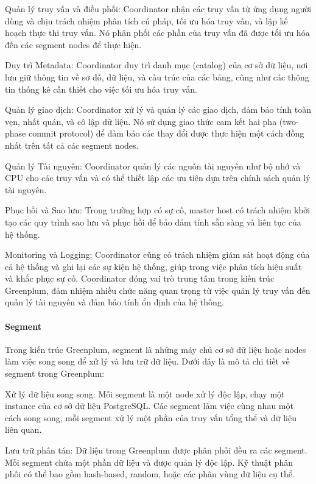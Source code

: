 \documentclass[14pt]{article}
\begin{document}
Quản lý truy vấn và điều phối: Coordinator nhận các truy vấn từ ứng dụng người dùng và chịu trách nhiệm phân tích cú pháp, tối ưu hóa truy vấn, và lập kế hoạch thực thi truy vấn. Nó phân phối các phần của truy vấn đã được tối ưu hóa đến các segment nodes để thực hiện.


Duy trì Metadata: Coordinator duy trì danh mục (catalog) của cơ sở dữ liệu, nơi lưu giữ thông tin về sơ đồ, dữ liệu, và cấu trúc của các bảng, cũng như các thông tin thống kê cần thiết cho việc tối ưu hóa truy vấn.

Quản lý giao dịch: Coordinator xử lý và quản lý các giao dịch, đảm bảo tính toàn vẹn, nhất quán, và cô lập dữ liệu. Nó sử dụng giao thức cam kết hai pha (two-phase commit protocol) để đảm bảo các thay đổi được thực hiện một cách đồng nhất trên tất cả các segment nodes.


Quản lý Tài nguyên: Coordinator quản lý các nguồn tài nguyên như bộ nhớ và CPU cho các truy vấn và có thể thiết lập các ưu tiên dựa trên chính sách quản lý tài nguyên.

Phục hồi và Sao lưu: Trong trường hợp có sự cố, master host có trách nhiệm khởi tạo các quy trình sao lưu và phục hồi để bảo đảm tính sẵn sàng và liên tục của hệ thống.

Monitoring và Logging: Coordinator cũng có trách nhiệm giám sát hoạt động của cả hệ thống và ghi lại các sự kiện hệ thống, giúp trong việc phân tích hiệu suất và khắc phục sự cố. Coordinator đóng vai trò trung tâm trong kiến trúc Greenplum, đảm nhiệm nhiều chức năng quan trọng từ việc quản lý truy vấn đến quản lý tài nguyên và đảm bảo tính ổn định của hệ thống.

\paragraph{Segment}

Trong kiến trúc Greenplum, segment là những máy chủ cơ sở dữ liệu hoặc
nodes làm việc song song để xử lý và lưu trữ dữ liệu. Dưới đây là mô tả chi tiết về segment trong Greenplum:

Xử lý dữ liệu song song: Mỗi segment là một node xử lý độc lập, chạy một instance của cơ sở dữ liệu PostgreSQL. Các segment làm việc cùng nhau một cách song song, mỗi segment xử lý một phần của truy vấn tổng thể và dữ liệu liên quan.

Lưu trữ phân tán: Dữ liệu trong Greenplum được phân phối đều ra các segment. Mỗi segment chứa một phần dữ liệu và được quản lý độc lập.
Kỹ thuật phân phối có thể bao gồm hash-based, random, hoặc các phân vùng
dữ liệu cụ thể. 
\end{document}
